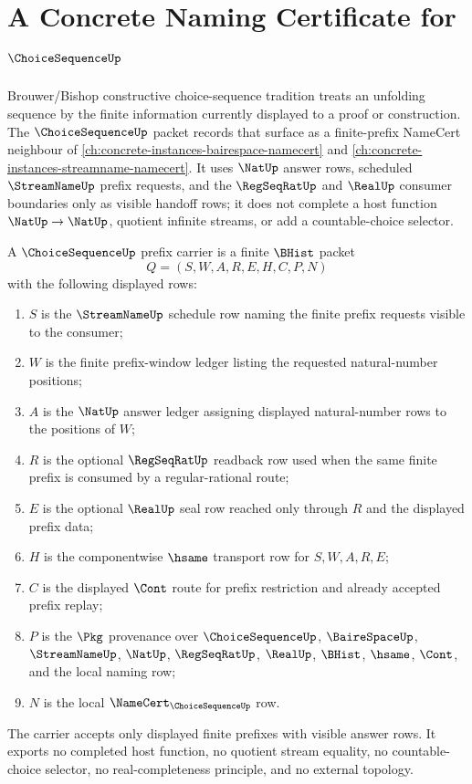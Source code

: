 \chapter{A Concrete Naming Certificate for $\ChoiceSequenceUp$}
\label{ch:concrete-instances-choice-sequence-namecert}

Brouwer/Bishop constructive choice-sequence tradition treats an unfolding sequence by the finite information currently displayed to a proof or construction. The $\ChoiceSequenceUp$ packet records that surface as a finite-prefix NameCert neighbour of \autoref{ch:concrete-instances-bairespace-namecert} and \autoref{ch:concrete-instances-streamname-namecert}. It uses $\NatUp$ answer rows, scheduled $\StreamNameUp$ prefix requests, and the $\RegSeqRatUp$ and $\RealUp$ consumer boundaries only as visible handoff rows; it does not complete a host function $\NatUp \to \NatUp$, quotient infinite streams, or add a countable-choice selector.

\begin{definition}
\label{def:choice-sequence-prefix-carrier}
A $\ChoiceSequenceUp$ prefix carrier is a finite $\BHist$ packet
$$
Q=(S,W,A,R,E,H,C,P,N)
$$
with the following displayed rows:
\begin{enumerate}
\item $S$ is the $\StreamNameUp$ schedule row naming the finite prefix requests visible to the consumer;
\item $W$ is the finite prefix-window ledger listing the requested natural-number positions;
\item $A$ is the $\NatUp$ answer ledger assigning displayed natural-number rows to the positions of $W$;
\item $R$ is the optional $\RegSeqRatUp$ readback row used when the same finite prefix is consumed by a regular-rational route;
\item $E$ is the optional $\RealUp$ seal row reached only through $R$ and the displayed prefix data;
\item $H$ is the componentwise $\hsame$ transport row for $S,W,A,R,E$;
\item $C$ is the displayed $\Cont$ route for prefix restriction and already accepted prefix replay;
\item $P$ is the $\Pkg$ provenance over $\ChoiceSequenceUp$, $\BaireSpaceUp$, $\StreamNameUp$, $\NatUp$, $\RegSeqRatUp$, $\RealUp$, $\BHist$, $\hsame$, $\Cont$, and the local naming row;
\item $N$ is the local $\NameCert_{\ChoiceSequenceUp}$ row.
\end{enumerate}
The carrier accepts only displayed finite prefixes with visible answer rows. It exports no completed host function, no quotient stream equality, no countable-choice selector, no real-completeness principle, and no external topology.
\end{definition}

